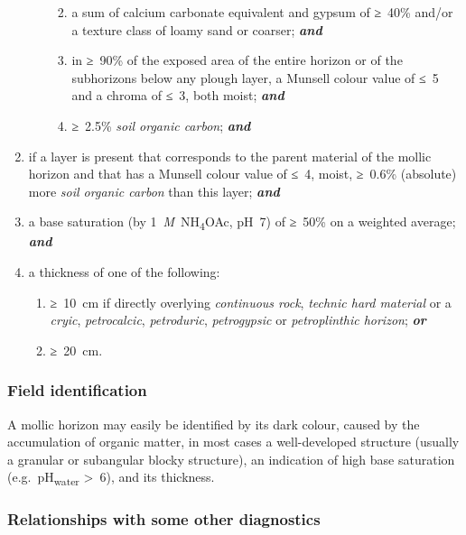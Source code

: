 \documentclass[
  letterpaper,
  DIV=11,
  numbers=noendperiod]{scrreprt}
\providecommand{\tightlist}{%
  \setlength{\itemsep}{0pt}\setlength{\parskip}{0pt}}\usepackage{longtable,booktabs,array}
\begin{document}
\begin{enumerate}
\begin{enumerate}
    \begin{enumerate}
    \def\labelenumiii{\roman{enumiii}.}
    \item
      a sum of calcium carbonate equivalent and gypsum of ≥~40\% and/or
      a texture class of loamy sand or coarser; \textbf{\emph{and}}
    \item
      in ≥~90\% of the exposed area of the entire horizon or of the
      subhorizons below any plough layer, a Munsell colour value of ≤~5
      and a chroma of ≤~3, both moist; \textbf{\emph{and}}
    \item
      ≥~2.5\% \emph{soil organic carbon}; \textbf{\emph{and}}
    \end{enumerate}
  \end{enumerate}
\item
  if a layer is present that corresponds to the parent material of the
  mollic horizon and that has a Munsell colour value of ≤~4, moist,
  ≥~0.6\% (absolute) more \emph{soil organic carbon} than this layer;
  \textbf{\emph{and}}
\item
  a base saturation (by 1~\emph{M}~NH\textsubscript{4}OAc, pH~7) of
  ≥~50\% on a weighted average; \textbf{\emph{and}}
\item
  a thickness of one of the following:

  \begin{enumerate}
  \def\labelenumii{\alph{enumii}.}
  \tightlist
  \item
    ≥~10~cm if directly overlying \emph{continuous rock}, \emph{technic
    hard material} or a \emph{cryic}, \emph{petrocalcic},
    \emph{petroduric}, \emph{petrogypsic} or \emph{petroplinthic
    horizon}; \textbf{\emph{or}}
  \item
    ≥~20~cm.
  \end{enumerate}
\end{enumerate}

\hypertarget{field-identification-14}{%
\subsubsection{Field identification}\label{field-identification-14}}

A mollic horizon may easily be identified by its dark colour, caused by
the accumulation of organic matter, in most cases a well-developed
structure (usually a granular or subangular blocky structure), an
indication of high base saturation (e.g.~pH\textsubscript{water}
\textgreater~6), and its thickness.

\hypertarget{relationships-with-some-other-diagnostics-19}{%
\subsubsection{Relationships with some other
diagnostics}\label{relationships-with-some-other-diagnostics-19}}
\end{document}
